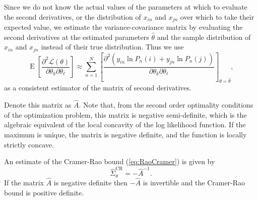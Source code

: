 \documentclass[12pt,a4paper]{article}
\newcommand{\req}[1]{(\ref{#1})}
\renewcommand{\L}{\mathcal{L}}
\newcommand{\expect}{\operatorname{E}}
\begin{document}
Since we do not know the actual values of the parameters at which to
evaluate the second derivatives, or the distribution of $x_{in}$ and
$x_{jn}$ over which to take their expected value, we estimate the
variance-covariance matrix by evaluating the second derivatives  at the estimated parameters
$\hat{\theta}$ and the sample distribution of $x_{in}$ and $x_{jn}$ instead of
 their true distribution. Thus we use
\begin{equation}
  \label{eq:BAL4.35}
  \expect\left[\frac{\partial^2 \L(\theta)}{\partial \theta_k \partial \theta_\ell}  \right]\approx \sum_{n=1}^N \left[\frac{\partial^2\left(y_{in}\ln P_n(i) + y_{jn} \ln P_n(j) \right)}{\partial \theta_k \partial \theta_\ell} \right]_{\theta=\hat{\theta}},
\end{equation}
as a consistent estimator of the matrix of second derivatives. 

Denote
this matrix as $\hat{A}$. Note that, from the second order optimality conditions of the optimization
problem, this matrix is negative semi-definite, which is the algebraic equivalent of the local  concavity of the
log likelihood function.
 If the maximum is unique, the matrix is negative definite, and the
 function is locally strictly concave. 




 An estimate of the Cramer-Rao
bound \req{eq:RaoCramer} is given by 
\begin{equation}
\label{eq:EstimateRaoCramer}
\widehat{\Sigma}^{\text{CR}}_{\theta} = -\hat{A}^{-1}.
\end{equation}
If  the matrix $\hat{A}$ is  negative definite then $-\hat{A}$ is invertible and the Cramer-Rao bound is positive definite. 
\end{document}
